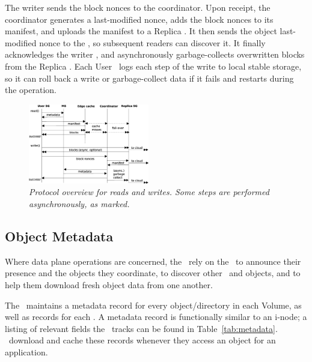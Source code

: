 The writer sends the block nonces
to the coordinator.  Upon receipt, the coordinator generates a last-modified
nonce, adds the block nonces to its manifest, and uploads the manifest to 
a Replica \SG.  It then sends the object last-modified nonce
to the \MS, so subsequent readers can discover it.
It finally acknowledges the writer \SG, and
asynchronously garbage-collects overwritten blocks from the Replica \SGs.
Each User \SG\ logs each step of the write to local stable storage, so it can
roll back a write or garbage-collect data if it fails and restarts during the operation.

\begin{figure}[h!]
\centering
\includegraphics[width=0.47\textwidth]{figures/protocols}
\caption{\it Protocol overview for reads and writes.  Some steps are performed asynchronously, as marked.}
\label{fig:protocols}
\end{figure}

\subsection{Object Metadata}
\label{sec:metadata-consistency}

Where data plane operations are 
concerned, the \SGs\ rely on the \MS\ to
announce their presence and the objects they coordinate,
to discover other \SGs\ and objects, and to help them download fresh
object data from one another.

The \MS\ maintains a metadata record for every object/directory in 
each Volume, as well as records for each \SG.
A metadata record is functionally similar to an i-node;
a listing of relevant fields the 
\MS\ tracks can be found in Table~\ref{tab:metadata}.
\SGs\ download and cache these records whenever they 
access an object for an application.


